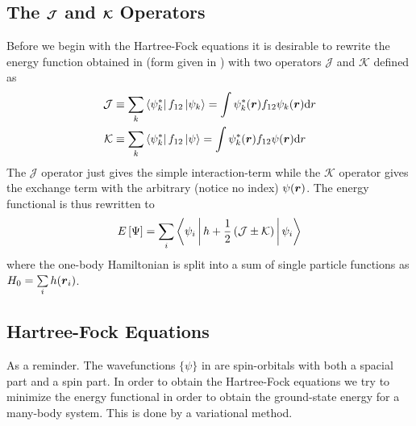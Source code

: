     \subsection{The $\boldsymbol{{\mathcal{J}}}$ and $\boldsymbol{{\mathcal{K}}}$ Operators}
        Before we begin with the Hartree-Fock equations it is desirable to
        rewrite the energy function obtained in  (form
        given in ) with two operators $\mathcal{J}$ and
        $\mathcal{K}$ defined as
            \begin{equation}
                \begin{aligned}
                    \mathcal{J} &\equiv \sum_k
                    \bra{\psi^{*}_k}f_{12}\ket{\psi_k} = \int
                    \psi^{*}_k(\boldsymbol{{r}})f_{12}\psi_k(\boldsymbol{{r}})\mathrm{d} r \\
                    \mathcal{K} &\equiv \sum_k
                    \bra{\psi^{*}_k}f_{12}\ket{\psi} = \int
                    \psi^{*}_k(\boldsymbol{{r}})f_{12}\psi(\boldsymbol{{r}})\mathrm{d} r \\
                \end{aligned}
            \end{equation}
        The $\mathcal{J}$ operator just gives the simple interaction-term while
        the $\mathcal{K}$ operator gives the exchange term with the arbitrary
        (notice no index) $\psi(\boldsymbol{{r}})$. The energy functional is thus
        rewritten to
            \begin{equation}
                E\left[\Psi\right] = \sum_i\Braket{\psi_i | h +
                \frac{1}{2}\left(\mathcal{J} \pm \mathcal{K}\right) | \psi_i}
                \label{eq:JKEfunc}
            \end{equation}
        where the one-body Hamiltonian is split into a sum of single particle
        functions as $H_0 = \sum\limits_i h(\boldsymbol{{r}}_i)$.

    \subsection{Hartree-Fock Equations}
        As a reminder. The wavefunctions $\{\psi\}$ in  are
        spin-orbitals with both a spacial part and a spin part. In order to
        obtain the Hartree-Fock equations we try to minimize the energy
        functional in order to obtain the ground-state energy for a many-body
        system. This is done by a variational method.


